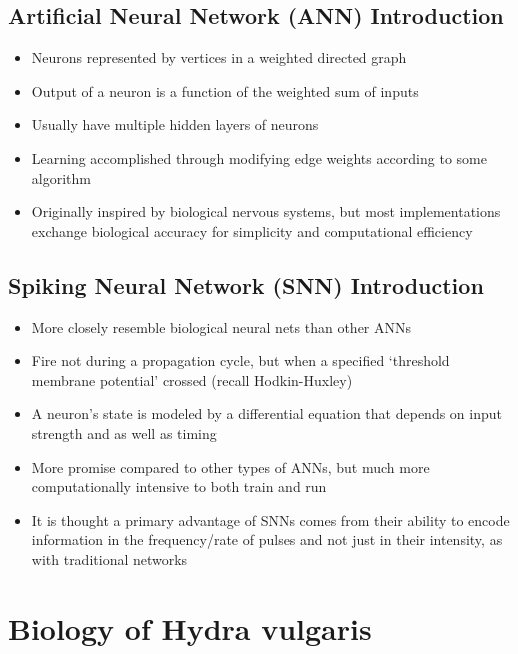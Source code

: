 \documentclass{article}
\begin{document}
\subsection{Artificial Neural Network (ANN) Introduction}
\begin{itemize}
\item Neurons represented by vertices in a weighted directed graph
\item Output of a neuron is a function of the weighted sum of inputs
\item Usually have multiple hidden layers of neurons
\item Learning accomplished through modifying edge weights according to some algorithm
\item Originally inspired by biological nervous systems, but most implementations exchange biological accuracy for simplicity and computational efficiency
\end{itemize}


\subsection{Spiking Neural Network (SNN) Introduction}
\begin{itemize}
\item More closely resemble biological neural nets than other ANNs
\item Fire not during a propagation cycle, but when a specified `threshold membrane potential' crossed (recall Hodkin-Huxley)
\item A neuron's state is modeled by a differential equation that depends on input strength and as well as timing
\item More promise compared to other types of ANNs, but much more computationally intensive to both train and run
\item It is thought a primary advantage of SNNs comes from their ability to encode information in the frequency/rate of pulses and not just in their intensity, as with traditional networks
\end{itemize}

\section{Biology of Hydra vulgaris}
\end{document}
